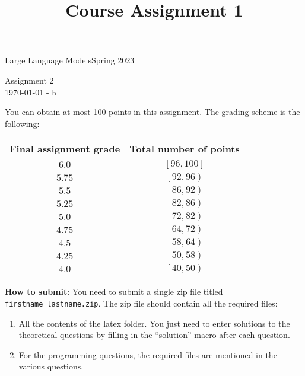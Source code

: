 \documentclass[a4paper,11pt]{ETHexercise}
\title{Course Assignment 1}
\newcommand{\timestamp}{\ddmmyyyydate\today \,\,- \currenttime h}
\begin{document}



{}
{\Large Large Language Models}{Spring 2023}
\begin{center}
    {\Huge Assignment 2}\\
      \quad\newline
    \timestamp
\end{center}





You can obtain at most 100 points in this assignment.
The grading scheme is the following:
\begin{center}
    \begin{tabular}{cc}
        \toprule
        Final assignment grade & Total number of points \\
        \midrule
        $6.0$ & $ \left[ 96, 100 \right]$ \\
        $5.75$ & $ \left[ 92, 96 \right)$ \\
        $5.5$ & $ \left[ 86, 92 \right)$ \\
        $5.25$ & $ \left[ 82, 86 \right)$ \\
        $5.0$ & $ \left[ 72, 82 \right)$ \\
        $4.75$ & $ \left[ 64, 72 \right)$ \\
        $4.5$ & $ \left[ 58, 64 \right)$ \\
        $4.25$ & $ \left[ 50, 58 \right)$ \\
        $4.0$ & $ \left[ 40, 50 \right)$ \\
        \bottomrule
    \end{tabular}    
\end{center}

\textcolor{ETHRed}{\textbf{How to submit}}: You need to submit a single zip file titled \texttt{firstname\_lastname.zip}. The zip file should contain all the required files:
\begin{enumerate}
    \item All the contents of the latex folder. You just need to enter solutions to the theoretical questions by filling in the ``solution'' macro after each question.
    \item For the programming questions, the required files are mentioned in the various questions. 
\end{enumerate}


\newpage{}


\newpage{}


\newpage{}


\newpage{}


\newpage{}


\newpage{}



\appendix

\end{document}
